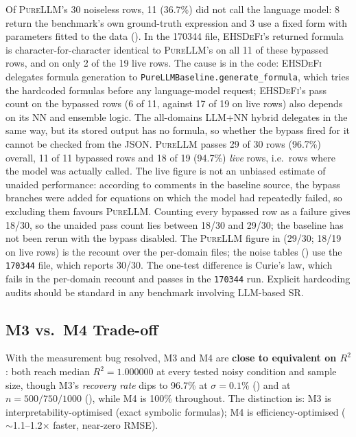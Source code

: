 \documentclass[twoside,11pt]{article}
\newcommand{\PureLLM}{\textsc{PureLLM}}
\newcommand{\EHD}{\textsc{EHSDeFi}}
\newcommand{\Rsq}{R^{2}}
\begin{document}
Of \PureLLM{}'s 30 noiseless rows, 11 (36.7\%) did not call the language model: 8 return the benchmark's own
ground-truth expression and 3 use a fixed form with parameters fitted to the data
(). In the 170344 file, \EHD{}'s returned formula is character-for-character identical to \PureLLM{}'s on all 11 of these bypassed rows, and on only 2 of the 19 live rows. The cause is in the code: \EHD{} delegates formula generation to \texttt{PureLLMBaseline.generate\_formula}, which tries the hardcoded formulas before any language-model request; \EHD{}'s pass count on the bypassed rows (6 of 11, against 17 of 19 on live rows) also depends on its NN and ensemble logic. The all-domains LLM+NN hybrid delegates in the same way, but its stored output has no formula, so whether the bypass fired for it cannot be checked from the JSON. \PureLLM{} passes 29 of 30 rows (96.7\%) overall, 11 of 11 bypassed rows and 18 of 19
(94.7\%) \emph{live} rows, i.e.\ rows where the model was actually called. The live figure is not an unbiased
estimate of unaided performance: according to comments in the baseline source, the bypass branches were added for
equations on which the model had repeatedly failed, so excluding them favours \PureLLM{}. Counting every bypassed
row as a failure gives 18/30, so the unaided pass count lies between 18/30 and 29/30; the baseline has not been rerun
with the bypass disabled.
The \PureLLM{} figure in  (29/30; 18/19 on live rows) is the recount over the per-domain files; the noise tables () use the \texttt{170344} file, which reports 30/30. The one-test difference is Curie's law, which fails in the per-domain recount and passes in the \texttt{170344} run.
Explicit hardcoding audits should be standard in any
benchmark involving LLM-based SR.

\subsection{M3 vs.\ M4 Trade-off}

With the measurement bug resolved, M3 and M4 are \textbf{close to
equivalent on $\Rsq$}: both reach median $\Rsq = 1.000000$ at every
tested noisy condition and sample size, though M3's \emph{recovery
rate} dips to 96.7\% at $\sigma=0.1\%$ () and at
$n=500/750/1000$ (), while M4 is 100\% throughout.
The distinction is: M3 is interpretability-optimised (exact symbolic
formulas); M4 is efficiency-optimised ($\sim$1.1--1.2$\times$ faster,
near-zero RMSE).
\end{document}
